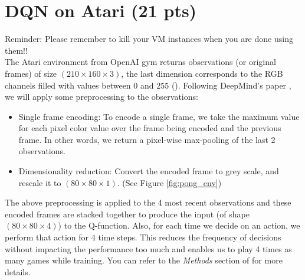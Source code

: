 \documentclass{article}
\newenvironment{myitemize}
{ \begin{itemize}
		\setlength{\itemsep}{0pt}
		\setlength{\parskip}{0pt}
		\setlength{\parsep}{0pt}     }
	{ \end{itemize}                  }
\begin{document}
\section{DQN on Atari (21 pts)}

Reminder: Please remember to kill your VM instances when you are done using them!! \\

The Atari environment from OpenAI gym returns observations (or original frames) of size $ (210 \times 160 \times 3) $, the last dimension corresponds to the RGB channels filled with values between $ 0 $ and $ 255 $ (). Following DeepMind's paper \cite{mnih2015human}, we will apply some preprocessing to the observations:
\begin{myitemize}
\item Single frame encoding: To encode a single frame, we take the maximum value for each pixel color value over the frame being encoded and the previous frame. In other words, we return a pixel-wise max-pooling of the last 2 observations.
\item Dimensionality reduction: Convert the encoded frame to grey scale, and rescale it to $(80 \times 80 \times 1)$. (See Figure \ref{fig:pong_env})
\end{myitemize}

The above preprocessing is applied to the 4 most recent observations and these encoded frames are stacked together to produce the input (of shape $(80 \times 80 \times 4)$) to the Q-function. Also, for each time we decide on an action, we perform that action for 4 time steps. This reduces the frequency of decisions without impacting the performance too much and enables us to play 4 times as many games while training. You can refer to the \textit{Methods} section of \cite{mnih2015human} for more details.       \\
\end{document}
